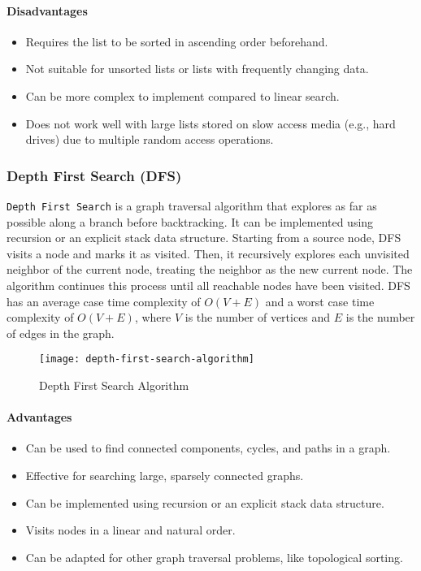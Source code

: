 \paragraph{Disadvantages}
\begin{itemize}
    \item Requires the list to be sorted in ascending order beforehand.
    \item Not suitable for unsorted lists or lists with frequently changing data.
    \item Can be more complex to implement compared to linear search.
    \item Does not work well with large lists stored on slow access media (e.g., hard drives) due to multiple random access operations.
\end{itemize}

\subsubsection{Depth First Search (DFS)}
\lstinline{Depth First Search} is a graph traversal algorithm that explores as far as possible along a branch before backtracking. It can be implemented using recursion or an explicit stack data structure. Starting from a source node, DFS visits a node and marks it as visited. Then, it recursively explores each unvisited neighbor of the current node, treating the neighbor as the new current node. The algorithm continues this process until all reachable nodes have been visited. DFS has an average case time complexity of $O(V + E)$ and a worst case time complexity of $O(V + E)$, where $V$ is the number of vertices and $E$ is the number of edges in the graph.

\begin{figure}[htbp]
    \centering
    \texttt{[image: depth-first-search-algorithm]}
    \caption{Depth First Search Algorithm \cite{zaltsman_dfs_bfs}}
    \label{fig:depth-first-search-algorithm}
\end{figure}

\paragraph{Advantages}
\begin{itemize}
    \item Can be used to find connected components, cycles, and paths in a graph.
    \item Effective for searching large, sparsely connected graphs.
    \item Can be implemented using recursion or an explicit stack data structure.
    \item Visits nodes in a linear and natural order.
    \item Can be adapted for other graph traversal problems, like topological sorting.
\end{itemize}
